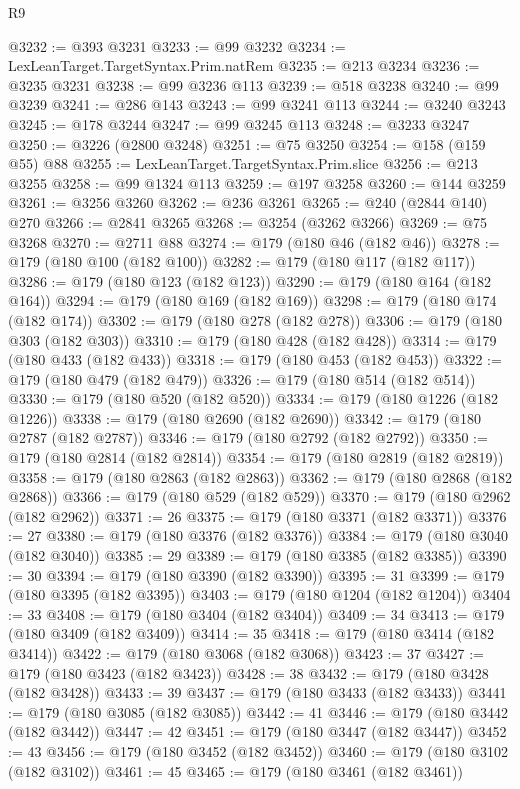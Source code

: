 \begin{lexlean}{R9}
\begin{coremodule}
{{{{{{{{{{{{{{{{{{{{{{{{{{{{{{{{{{{{{{{{{{{{{{{{{{{{{{{{{{{{{{{{{{{{{{{{{{{{{{{{{{{{@3232 := @393 @3231
@3233 := @99 @3232
@3234 := LexLeanTarget.TargetSyntax.Prim.natRem
@3235 := @213 @3234
@3236 := @3235 @3231
@3238 := @99 @3236 @113
@3239 := @518 @3238
@3240 := @99 @3239
@3241 := @286 @143
@3243 := @99 @3241 @113
@3244 := @3240 @3243
@3245 := @178 @3244
@3247 := @99 @3245 @113
@3248 := @3233 @3247
@3250 := @3226 (@2800 @3248)
@3251 := @75 @3250
@3254 := @158 (@159 @55) @88
@3255 := LexLeanTarget.TargetSyntax.Prim.slice
@3256 := @213 @3255
@3258 := @99 @1324 @113
@3259 := @197 @3258
@3260 := @144 @3259
@3261 := @3256 @3260
@3262 := @236 @3261
@3265 := @240 (@2844 @140) @270
@3266 := @2841 @3265
@3268 := @3254 (@3262 @3266)
@3269 := @75 @3268
@3270 := @2711 @88
@3274 := @179 (@180 @46 (@182 @46))
@3278 := @179 (@180 @100 (@182 @100))
@3282 := @179 (@180 @117 (@182 @117))
@3286 := @179 (@180 @123 (@182 @123))
@3290 := @179 (@180 @164 (@182 @164))
@3294 := @179 (@180 @169 (@182 @169))
@3298 := @179 (@180 @174 (@182 @174))
@3302 := @179 (@180 @278 (@182 @278))
@3306 := @179 (@180 @303 (@182 @303))
@3310 := @179 (@180 @428 (@182 @428))
@3314 := @179 (@180 @433 (@182 @433))
@3318 := @179 (@180 @453 (@182 @453))
@3322 := @179 (@180 @479 (@182 @479))
@3326 := @179 (@180 @514 (@182 @514))
@3330 := @179 (@180 @520 (@182 @520))
@3334 := @179 (@180 @1226 (@182 @1226))
@3338 := @179 (@180 @2690 (@182 @2690))
@3342 := @179 (@180 @2787 (@182 @2787))
@3346 := @179 (@180 @2792 (@182 @2792))
@3350 := @179 (@180 @2814 (@182 @2814))
@3354 := @179 (@180 @2819 (@182 @2819))
@3358 := @179 (@180 @2863 (@182 @2863))
@3362 := @179 (@180 @2868 (@182 @2868))
@3366 := @179 (@180 @529 (@182 @529))
@3370 := @179 (@180 @2962 (@182 @2962))
@3371 := 26
@3375 := @179 (@180 @3371 (@182 @3371))
@3376 := 27
@3380 := @179 (@180 @3376 (@182 @3376))
@3384 := @179 (@180 @3040 (@182 @3040))
@3385 := 29
@3389 := @179 (@180 @3385 (@182 @3385))
@3390 := 30
@3394 := @179 (@180 @3390 (@182 @3390))
@3395 := 31
@3399 := @179 (@180 @3395 (@182 @3395))
@3403 := @179 (@180 @1204 (@182 @1204))
@3404 := 33
@3408 := @179 (@180 @3404 (@182 @3404))
@3409 := 34
@3413 := @179 (@180 @3409 (@182 @3409))
@3414 := 35
@3418 := @179 (@180 @3414 (@182 @3414))
@3422 := @179 (@180 @3068 (@182 @3068))
@3423 := 37
@3427 := @179 (@180 @3423 (@182 @3423))
@3428 := 38
@3432 := @179 (@180 @3428 (@182 @3428))
@3433 := 39
@3437 := @179 (@180 @3433 (@182 @3433))
@3441 := @179 (@180 @3085 (@182 @3085))
@3442 := 41
@3446 := @179 (@180 @3442 (@182 @3442))
@3447 := 42
@3451 := @179 (@180 @3447 (@182 @3447))
@3452 := 43
@3456 := @179 (@180 @3452 (@182 @3452))
@3460 := @179 (@180 @3102 (@182 @3102))
@3461 := 45
@3465 := @179 (@180 @3461 (@182 @3461))
}}}}}}}}}}}}}}}}}}}}}}}}}}}}}}}}}}}}}}}}}}}}}}}}}}}}}}}}}}}}}}}}}}}}}}}}}}}}}}}}}}}}
\end{coremodule}
\end{lexlean}

